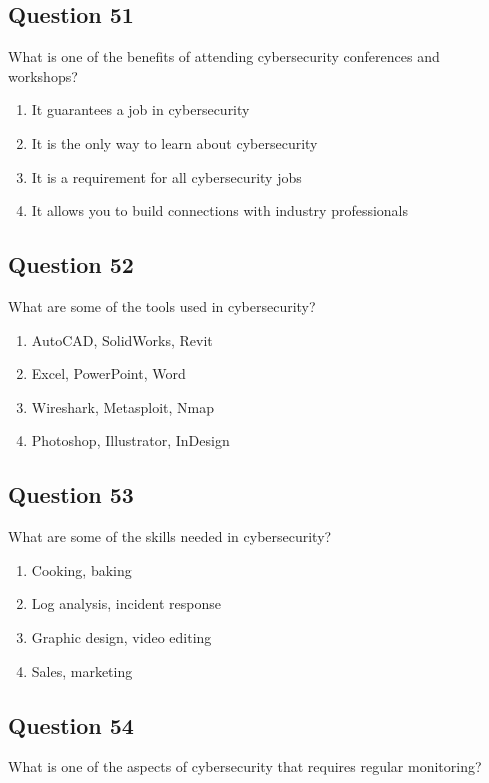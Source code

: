 \documentclass[12pt,a4paper]{article}
\begin{document}
\bigskip


\subsection*{Question 51}
What is one of the benefits of attending cybersecurity conferences and workshops?

\begin{enumerate}[label=\Alph*., leftmargin=*]
\item It guarantees a job in cybersecurity
\item It is the only way to learn about cybersecurity
\item It is a requirement for all cybersecurity jobs
\item It allows you to build connections with industry professionals
\end{enumerate}

\bigskip


\subsection*{Question 52}
What are some of the tools used in cybersecurity?

\begin{enumerate}[label=\Alph*., leftmargin=*]
\item AutoCAD, SolidWorks, Revit
\item Excel, PowerPoint, Word
\item Wireshark, Metasploit, Nmap
\item Photoshop, Illustrator, InDesign
\end{enumerate}

\bigskip


\subsection*{Question 53}
What are some of the skills needed in cybersecurity?

\begin{enumerate}[label=\Alph*., leftmargin=*]
\item Cooking, baking
\item Log analysis, incident response
\item Graphic design, video editing
\item Sales, marketing
\end{enumerate}

\bigskip


\subsection*{Question 54}
What is one of the aspects of cybersecurity that requires regular monitoring?
\end{document}
